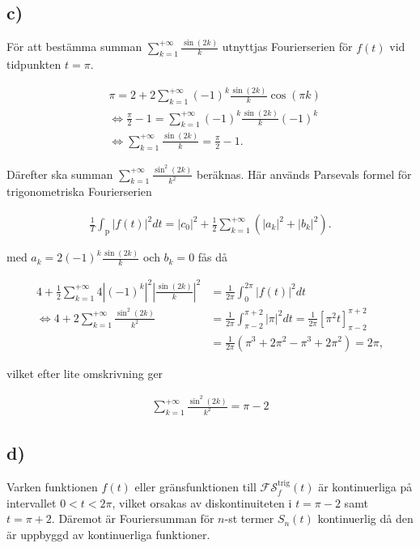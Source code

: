 \documentclass[a4paper]{article}
\begin{document}
\FloatBarrier

\subsection*{c)}

För att bestämma summan $\sum_{k=1}^{+\infty}\frac{\sin(2k)}{k}$ utnyttjas
Fourierserien för $f(t)$ vid tidpunkten $t = \pi$.

\begin{align*}
  &\pi = 2 + 2\sum_{k=1}^{+\infty}(-1)^k\frac{\sin(2k)}{k}\cos(\pi k)\\
  &\iff \frac{\pi}{2} - 1 = \sum_{k=1}^{+\infty}(-1)^k\frac{\sin(2k)}{k}(-1)^k\\
  &\iff \sum_{k=1}^{+\infty}\frac{\sin(2k)}{k} = \frac{\pi}{2} - 1.
\end{align*}

\noindent Därefter ska summan $\sum_{k=1}^{+\infty}\frac{\sin^2(2k)}{k^2}$ beräknas. Här används Parsevals formel för trigonometriska Fourierserien

\begin{align*}
  \frac{1}{T}\int_{\text{p}}\left| f(t) \right|^2 dt = |c_0|^2 + \frac{1}{2} \sum_{k=1}^{+\infty} \left( |a_k|^2 + |b_k|^2\right).
\end{align*}

\noindent med $a_k = 2(-1)^k\frac{\sin(2k)}{k}$ och $b_k = 0$ fås då

\begin{align*}
  4 + \frac{1}{2}\sum_{k=1}^{+\infty}4\left| (-1)^k\right|^2\left|\frac{\sin(2k)}{k}\right|^2 &= \frac{1}{2\pi}\int_0^{2\pi}|f(t)|^2dt\\
  \iff 4 + 2\sum_{k=1}^{+\infty}\frac{\sin^2(2k)}{k^2} &= \frac{1}{2\pi}\int_{\pi-2}^{\pi+2}|\pi|^2dt = \frac{1}{2\pi}\left[\pi^2t\right]_{\pi-2}^{\pi+2}\\
  &=\frac{1}{2\pi}\left(\pi^3 + 2\pi^2 - \pi^3 + 2\pi^2\right) = 2\pi,
\end{align*}

\noindent vilket efter lite omskrivning ger

\begin{align*}
  \sum_{k=1}^{+\infty}\frac{\sin^2(2k)}{k^2} = \pi - 2
\end{align*}

\subsection*{d)}

Varken funktionen $f(t)$ eller gränsfunktionen till $\mathcal{FS}_f^{\text{trig}}(t)$ är kontinuerliga på intervallet $0 < t < 2\pi$, vilket orsakas av diskontinuiteten i $t = \pi - 2$ samt $t = \pi + 2$. Däremot är Fouriersumman för $n$-st termer $S_n(t)$ kontinuerlig då den är uppbyggd av kontinuerliga funktioner.
\end{document}
